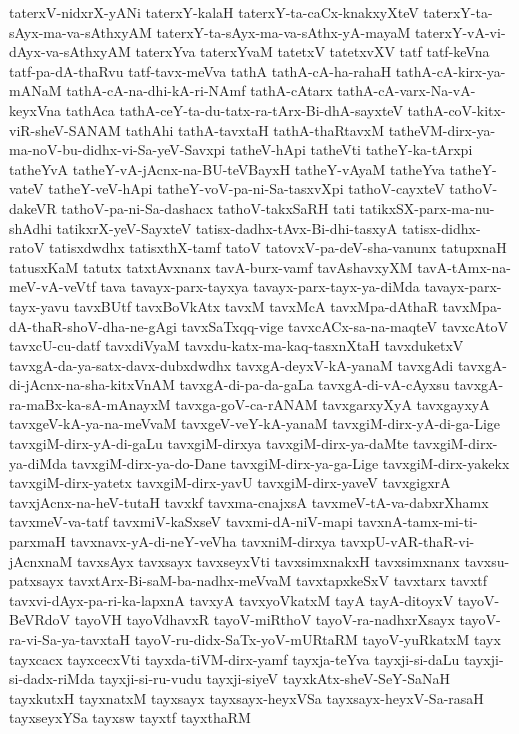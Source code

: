 {taterxV-nidxrX-yANi
taterxY-kalaH
taterxY-ta-caCx-knakxyXteV
taterxY-ta-sAyx-ma-va-sAthxyAM
taterxY-ta-sAyx-ma-va-sAthx-yA-mayaM
taterxY-vA-vi-dAyx-va-sAthxyAM
taterxYva
taterxYvaM
tatetxV
tatetxvXV
tatf
tatf-keVna
tatf-pa-dA-thaRvu
tatf-tavx-meVva
tathA
tathA-cA-ha-rahaH
tathA-cA-kirx-ya-mANaM
tathA-cA-na-dhi-kA-ri-NAmf
tathA-cAtarx
tathA-cA-varx-Na-vA-keyxVna
tathAca
tathA-ceY-ta-du-tatx-ra-tArx-Bi-dhA-sayxteV
tathA-coV-kitx-viR-sheV-SANAM
tathAhi
tathA-tavxtaH
tathA-thaRtavxM
tatheVM-dirx-ya-ma-noV-bu-didhx-vi-Sa-yeV-Savxpi
tatheV-hApi
tatheVti
tatheY-ka-tArxpi
tatheYvA
tatheY-vA-jAcnx-na-BU-teVBayxH
tatheY-vAyaM
tatheYva
tatheY-vateV
tatheY-veV-hApi
tatheY-voV-pa-ni-Sa-tasxvXpi
tathoV-cayxteV
tathoV-dakeVR
tathoV-pa-ni-Sa-dashacx
tathoV-takxSaRH
tati
tatikxSX-parx-ma-nu-shAdhi
tatikxrX-yeV-SayxteV
tatisx-dadhx-tAvx-Bi-dhi-tasxyA
tatisx-didhx-ratoV
tatisxdwdhx
tatisxthX-tamf
tatoV
tatovxV-pa-deV-sha-vanunx
tatupxnaH
tatusxKaM
tatutx
tatxtAvxnanx
tavA-burx-vamf
tavAshavxyXM
tavA-tAmx-na-meV-vA-veVtf
tava
tavayx-parx-tayxya
tavayx-parx-tayx-ya-diMda
tavayx-parx-tayx-yavu
tavxBUtf
tavxBoVkAtx
tavxM
tavxMcA
tavxMpa-dAthaR
tavxMpa-dA-thaR-shoV-dha-ne-gAgi
tavxSaTxqq-vige
tavxcACx-sa-na-maqteV
tavxcAtoV
tavxcU-cu-datf
tavxdiVyaM
tavxdu-katx-ma-kaq-tasxnXtaH
tavxduketxV
tavxgA-da-ya-satx-davx-dubxdwdhx
tavxgA-deyxV-kA-yanaM
tavxgAdi
tavxgA-di-jAcnx-na-sha-kitxVnAM
tavxgA-di-pa-da-gaLa
tavxgA-di-vA-cAyxsu
tavxgA-ra-maBx-ka-sA-mAnayxM
tavxga-goV-ca-rANAM
tavxgarxyXyA
tavxgayxyA
tavxgeV-kA-ya-na-meVvaM
tavxgeV-veY-kA-yanaM
tavxgiM-dirx-yA-di-ga-Lige
tavxgiM-dirx-yA-di-gaLu
tavxgiM-dirxya
tavxgiM-dirx-ya-daMte
tavxgiM-dirx-ya-diMda
tavxgiM-dirx-ya-do-Dane
tavxgiM-dirx-ya-ga-Lige
tavxgiM-dirx-yakekx
tavxgiM-dirx-yatetx
tavxgiM-dirx-yavU
tavxgiM-dirx-yaveV
tavxgigxrA
tavxjAcnx-na-heV-tutaH
tavxkf
tavxma-cnajxsA
tavxmeV-tA-va-dabxrXhamx
tavxmeV-va-tatf
tavxmiV-kaSxseV
tavxmi-dA-niV-mapi
tavxnA-tamx-mi-ti-parxmaH
tavxnavx-yA-di-neY-veVha
tavxniM-dirxya
tavxpU-vAR-thaR-vi-jAcnxnaM
tavxsAyx
tavxsayx
tavxseyxVti
tavxsimxnakxH
tavxsimxnanx
tavxsu-patxsayx
tavxtArx-Bi-saM-ba-nadhx-meVvaM
tavxtapxkeSxV
tavxtarx
tavxtf
tavxvi-dAyx-pa-ri-ka-lapxnA
tavxyA
tavxyoVkatxM
tayA
tayA-ditoyxV
tayoV-BeVRdoV
tayoVH
tayoVdhavxR
tayoV-miRthoV
tayoV-ra-nadhxrXsayx
tayoV-ra-vi-Sa-ya-tavxtaH
tayoV-ru-didx-SaTx-yoV-mURtaRM
tayoV-yuRkatxM
tayx
tayxcacx
tayxcecxVti
tayxda-tiVM-dirx-yamf
tayxja-teYva
tayxji-si-daLu
tayxji-si-dadx-riMda
tayxji-si-ru-vudu
tayxji-siyeV
tayxkAtx-sheV-SeY-SaNaH
tayxkutxH
tayxnatxM
tayxsayx
tayxsayx-heyxVSa
tayxsayx-heyxV-Sa-rasaH
tayxseyxYSa
tayxsw
tayxtf
tayxthaRM
}

